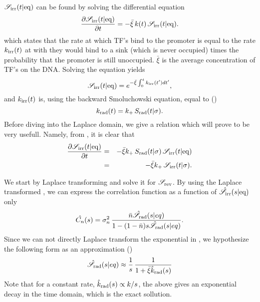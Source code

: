 $\mathscr{S}_{\rm irr}(t|{\rm eq})$ can be found by solving the differential equation
\begin{equation}
 \pdiff{\mathscr{S}_{\rm irr}(t|{\rm eq})}{t} = - \bar{\xi} \, k(t) \, \mathscr{S}_{\rm irr}(t|{\rm eq}).
 \elabel{DE_Seq}
\end{equation}
which states that the rate at which TF's bind to the promoter is equal to the rate $k_{{\rm irr}}(t)$ at with they would bind to a sink (which is never occupied) times the probability that the promoter is still unoccupied. $\bar{\xi}$ is the average concentration of TF's on the DNA. Solving the equation yields
\begin{equation}
 \mathscr{S}_{\rm irr}(t|{\rm eq}) = e^{-\bar{\xi}\int_0^t k_{{\rm irr}}(t') dt'},
 \elabel{Seq}
\end{equation}
and $k_{{\rm irr}}(t)$ is, using the backward Smoluchowski equation, equal to ()
\begin{equation}
 k_{\rm rad}(t) = k_+ \, S_{\rm rad}(t|\sigma).
 \elabel{krad}
\end{equation}
Before diving into the Laplace domain, we give a relation which will prove to be very usefull. Namely, from , it is clear that
\begin{eqnarray}
 \pdiff{\mathscr{S}_{\rm irr}(t|{\rm eq})}{t} & = & -\bar{\xi} k_+ \, S_{\rm rad}(t|\sigma) \, \mathscr{S}_{\rm irr}(t|{\rm eq}) \\
 & = & -\bar{\xi} k_+ \, \mathscr{S}_{\rm irr}(t|\sigma).
 \elabel{SeqSsi}
\end{eqnarray}

We start by Laplace transforming  and solve it for $\mathscr{S}_{\rm rev}$. By using the Laplace transformed , we can express the correlation function as a function of $\hat{\mathscr{S}}_{\rm irr}(s|{\rm eq})$ only
\begin{equation}
 \hat{C_n}(s) = \sigma_n^2 \, \frac{\bar{n} \hat{\mathscr{S}}_{\rm rad}(s|eq)}{1-(1-\bar{n})s\hat{\mathscr{S}}_{\rm rad}(s|eq)}.
 \elabel{LapCorr}
\end{equation}
Since we can not directly Laplace transform the exponential in , we hypothesize the following form as an approximation ()
\begin{equation}
 \hat{\mathscr{S}}_{\rm rad}(s|eq) \approx \frac{1}{s}  \, \frac{1}{ 1 + \bar{\xi} \hat{k}_{\rm rad}(s)}
 \elabel{Seq_approx}
\end{equation}
Note that for a constant rate, $\hat{k}_{\rm rad}(s) \propto k/s$, the above gives an exponential decay in the time domain, which is the exact sollution. 

